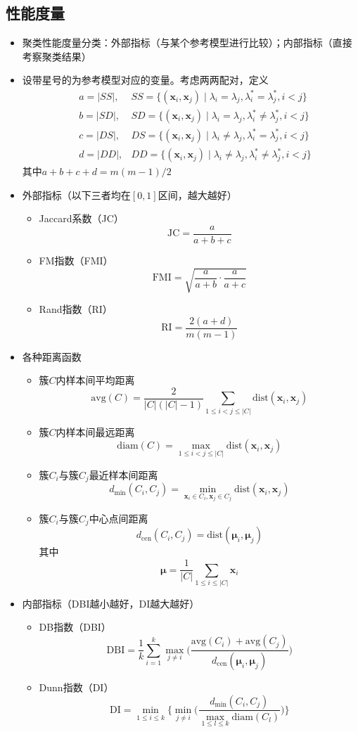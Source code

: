 \documentclass{ctexart}
\begin{document}
				\subsection{性能度量}
					\begin{itemize}
						\item 聚类性能度量分类：外部指标（与某个参考模型进行比较）；内部指标（直接考察聚类结果）
						\item 设带星号的为参考模型对应的变量。考虑两两配对，定义\begin{align*}
							& a = |SS|, & SS=\{(\bm{x}_i,\bm{x}_j)\mid\lambda_i=\lambda_j,\lambda_i^*=\lambda_j^*,i<j\}\\
							& b = |SD|, & SD=\{(\bm{x}_i,\bm{x}_j)\mid\lambda_i=\lambda_j,\lambda_i^*\neq\lambda_j^*,i<j\}\\
							& c = |DS|, & DS=\{(\bm{x}_i,\bm{x}_j)\mid\lambda_i\neq\lambda_j,\lambda_i^*=\lambda_j^*,i<j\}\\
							& d = |DD|, & DD=\{(\bm{x}_i,\bm{x}_j)\mid\lambda_i\neq\lambda_j,\lambda_i^*\neq\lambda_j^*,i<j\}
						\end{align*}
						其中$a+b+c+d=m(m-1)/2$
						\item 外部指标（以下三者均在$[0,1]$区间，越大越好）\begin{itemize}
							\item Jaccard系数（JC）\[\mathrm{JC}=\frac{a}{a+b+c}\]
							\item FM指数（FMI）\[\mathrm{FMI}=\sqrt{\frac{a}{a+b}\cdot\frac{a}{a+c}}\]
							\item Rand指数（RI）\[\mathrm{RI}=\frac{2(a+d)}{m(m-1)}\]
						\end{itemize}
						\item 各种距离函数\begin{itemize}
							\item 簇$C$内样本间平均距离\[\mathrm{avg}(C)=\frac{2}{|C|(|C|-1)}\sum_{1\le i<j\le|C|}^{}\mathrm{dist}(\bm{x}_i,\bm{x}_j)\]
							\item 簇$C$内样本间最远距离\[\mathrm{diam}(C)=\max_{1\le i<j\le|C|}\mathrm{dist}(\bm{x}_i,\bm{x}_j)\]
							\item 簇$C_i$与簇$C_j$最近样本间距离\[d_{\mathrm{min}}(C_i,C_j)=\min_{\bm{x}_i\in C_i,\bm{x}_j\in C_j}\mathrm{dist}(\bm{x}_i,\bm{x}_j)\]
							\item 簇$C_i$与簇$C_j$中心点间距离\[d_{\mathrm{cen}}(C_i,C_j)=\mathrm{dist}(\bm{\mu}_i,\bm{\mu}_j)\]其中\[\bm{\mu}=\frac{1}{|C|}\sum_{1\le i\le|C|}^{}\bm{x}_i\]
						\end{itemize}
					\item 内部指标（DBI越小越好，DI越大越好）\begin{itemize}
						\item DB指数（DBI）\[\mathrm{DBI}=\frac{1}{k}\sum_{i=1}^{k}\max\limits_{j\neq i}\bigg(\frac{\mathrm{avg}(C_i)+\mathrm{avg}(C_j)}{d_{\mathrm{cen}}(\bm{\mu}_i,\bm{\mu}_j)}\bigg)\]
						\item Dunn指数（DI）\[\mathrm{DI}=\min\limits_{1\le i\le k}\bigg\{\min\limits_{j\neq i}\bigg(\frac{d_{\mathrm{min}}(C_i,C_j)}{\max_{1\le l\le k}\mathrm{diam}(C_l)}\bigg)\bigg\}\]
					\end{itemize}
					\end{itemize}
\end{document}
